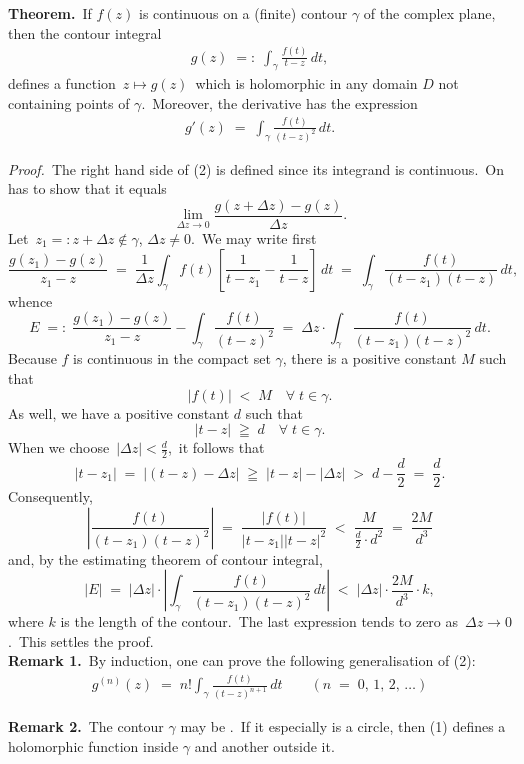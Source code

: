 \documentclass[12pt]{article}
\theoremstyle{definition}
\begin{document}
\textbf{Theorem.}\, If $f(z)$ is continuous on a (finite) contour $\gamma$ of the complex plane, then the contour integral
\begin{align}
g(z) \;=:\; \int_{\gamma}\frac{f(t)}{t\!-\!z}\,dt,
\end{align}
defines a function \,$z \mapsto g(z)$\, which is holomorphic in any domain $D$ not containing points of $\gamma$.\, Moreover, the derivative has the expression
\begin{align}
g'(z) \;=\; \int_{\gamma}\!\frac{f(t)}{(t\!-\!z)^2}\,dt.
\end{align}



\emph{Proof.}\, The right hand side of (2) is defined since its integrand is continuous.\, On has to show that it equals
$$\lim_{\Delta z \to 0}\frac{g(z\!+\!\Delta z)\!-\!g(z)}{\Delta z}.$$
Let\, $z_1 =: z\!+\!\Delta z \notin \gamma$,\; $\Delta z \neq 0$.\, We may write first
$$\frac{g(z_1)-g(z)}{z_1\!-\!z} 
\;=\; \frac{1}{\Delta z}\int_{\gamma}f(t)\left[\frac{1}{t\!-\!z_1}-\frac{1}{t\!-\!z}\right]\,dt
\;=\; \int_{\gamma}\frac{f(t)}{(t\!-\!z_1)(t\!-\!z)}\,dt,$$
whence
$$E \;=:\; \frac{g(z_1)-g(z)}{z_1\!-\!z}-\int_{\gamma}\frac{f(t)}{(t\!-\!z)^2} 
\;=\; \Delta z\cdot\!\int_{\gamma}\frac{f(t)}{(t\!-\!z_1)(t\!-\!z)^2}\,dt.$$
Because $f$ is continuous in the compact set $\gamma$, there is a positive constant $M$ such that
$$|f(t)| \;<\; M \quad \forall\; t \in \gamma.$$
As well, we have a positive constant $d$ such that
$$|t\!-\!z| \;\geqq\; d \quad \forall\; t \in \gamma.$$
When we choose\, $|\Delta z| < \frac{d}{2}$,\, it follows that
$$|t\!-\!z_1| \;=\; |(t\!-\!z)-\Delta z| \;\geqq\; |t\!-\!z|-|\Delta z| \;>\; d\!-\!\frac{d}{2} \;=\; \frac{d}{2}.$$
Consequently, 
$$\left|\frac{f(t)}{(t\!-\!z_1)(t\!-\!z)^2}\right| \;=\; \frac{|f(t)|}{|t\!-\!z_1||t\!-\!z|^2} 
\;<\; \frac{M}{\frac{d}{2}\cdot d^2} \;=\; \frac{2M}{d^3}$$
and, by the estimating theorem of contour integral, 
$$|E| \;=\; |\Delta z|\cdot\left|\int_{\gamma}\frac{f(t)}{(t\!-\!z_1)(t\!-\!z)^2}\,dt\right|
\;<\; |\Delta z|\cdot\frac{2M}{d^3}\cdot k,$$
where $k$ is the length of the contour.\, The last expression tends to zero as\, $\Delta z \to 0$.\, This settles the proof.\\


\textbf{Remark 1.}\, By induction, one can prove the following generalisation of (2):
\begin{align}
g^{(n)}(z) \;=\; n!\!\int_{\gamma}\!\frac{f(t)}{(t\!-\!z)^{n+1}}\,dt \qquad (n \;=\; 0,\,1,\,2,\,\ldots)
\end{align}

\textbf{Remark 2.}\, The contour $\gamma$ may be .\, If it especially is a circle, then (1) defines a holomorphic function inside $\gamma$ and another outside it.

\end{document}
